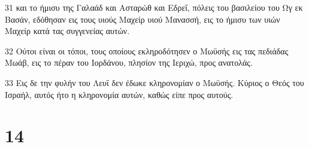 \par 31 και το ήμισυ της Γαλαάδ και Ασταρώθ και Εδρεΐ, πόλεις του βασιλείου του Ωγ εκ Βασάν, εδόθησαν εις τους υιούς Μαχείρ υιού Μανασσή, εις το ήμισυ των υιών Μαχείρ κατά τας συγγενείας αυτών.
\par 32 Ούτοι είναι οι τόποι, τους οποίους εκληροδότησεν ο Μωϋσής εις τας πεδιάδας Μωάβ, εις το πέραν του Ιορδάνου, πλησίον της Ιεριχώ, προς ανατολάς.
\par 33 Εις δε την φυλήν του Λευΐ δεν έδωκε κληρονομίαν ο Μωϋσής. Κύριος ο Θεός του Ισραήλ, αυτός ήτο η κληρονομία αυτών, καθώς είπε προς αυτούς.

\chapter{14}


